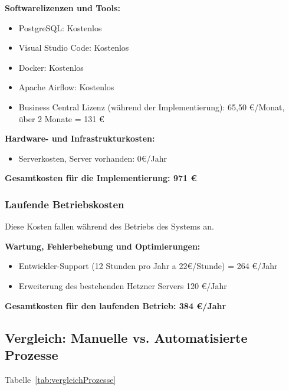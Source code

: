 	\textbf{Softwarelizenzen und Tools:}
    \begin{itemize}
        \item PostgreSQL: Kostenlos
        \item Visual Studio Code: Kostenlos
        \item Docker: Kostenlos
        \item Apache Airflow: Kostenlos
        \item Business Central Lizenz (während der Implementierung): 65,50 €/Monat, über 2 Monate = 131 € 
    \end{itemize}

	\textbf{Hardware- und Infrastrukturkosten:}
    \begin{itemize}
        \item Serverkosten, Server vorhanden: 0€/Jahr
    \end{itemize}
        
	\textbf{Gesamtkosten für die Implementierung: 971 €}

\subsubsection{Laufende Betriebskosten}
\label{Betriebskosten}

Diese Kosten fallen während des Betriebs des Systems an.

\textbf{Wartung, Fehlerbehebung und Optimierungen:}
\begin{itemize}
    \item Entwickler-Support (12 Stunden pro Jahr a 22€/Stunde) = 264 €/Jahr
    \item Erweiterung des bestehenden Hetzner Servers 120 €/Jahr
\end{itemize}

\textbf{Gesamtkosten für den laufenden Betrieb: 384 €/Jahr }

\clearpage

\subsection{Vergleich: Manuelle vs. Automatisierte Prozesse}
\label{vergleichProzesse}
Tabelle~\ref{tab:vergleichProzesse}
\\



















